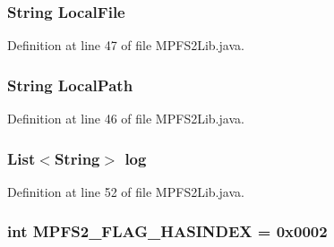 \subsubsection[{Local\+File}]{\setlength{\rightskip}{0pt plus 5cm}String Local\+File}\label{class_microchip_m_p_f_s_1_1_m_p_f_s2_lib_a26bf3056ff1696480b7019462a2b408d}


Definition at line 47 of file M\+P\+F\+S2\+Lib.\+java.

\hypertarget{class_microchip_m_p_f_s_1_1_m_p_f_s2_lib_aa396fc601d5eda5056c98ece9d06b262}{}
\subsubsection[{Local\+Path}]{\setlength{\rightskip}{0pt plus 5cm}String Local\+Path}\label{class_microchip_m_p_f_s_1_1_m_p_f_s2_lib_aa396fc601d5eda5056c98ece9d06b262}


Definition at line 46 of file M\+P\+F\+S2\+Lib.\+java.

\hypertarget{class_microchip_m_p_f_s_1_1_m_p_f_s2_lib_a295bf7f0c9391961619252654d092898}{}
\subsubsection[{log}]{\setlength{\rightskip}{0pt plus 5cm}List$<$String$>$ log}\label{class_microchip_m_p_f_s_1_1_m_p_f_s2_lib_a295bf7f0c9391961619252654d092898}


Definition at line 52 of file M\+P\+F\+S2\+Lib.\+java.

\hypertarget{class_microchip_m_p_f_s_1_1_m_p_f_s2_lib_aeb8d9420f95959fa34c94e3d1f4f9ffa}{}
\subsubsection[{M\+P\+F\+S2\+\_\+\+F\+L\+A\+G\+\_\+\+H\+A\+S\+I\+N\+D\+E\+X}]{\setlength{\rightskip}{0pt plus 5cm}int M\+P\+F\+S2\+\_\+\+F\+L\+A\+G\+\_\+\+H\+A\+S\+I\+N\+D\+E\+X = 0x0002}\label{class_microchip_m_p_f_s_1_1_m_p_f_s2_lib_aeb8d9420f95959fa34c94e3d1f4f9ffa}


